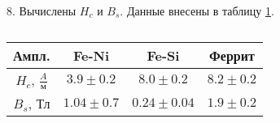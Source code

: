 8. Вычислены $H_c$ и $B_s$. Данные внесены в таблицу \ref{tab:4}.

\begin{table}
	\centering
	\begin{tabular}{|c|c|c|c|}
	\hline
	Ампл. & Fe-Ni & Fe-Si & Феррит \\
	\hline
	$H_c$, $\frac{A}{\text{м}}$ & $3.9 \pm 0.2$ & $8.0 \pm 0.2$ & $8.2 \pm 0.2$\\
	$B_s$, Тл & $1.04 \pm 0.7$& $0.24 \pm 0.04$& $1.9 \pm 0.2$\\
	\hline
	\end{tabular}
	\caption{}
	\label{tab:4}
\end{table}
